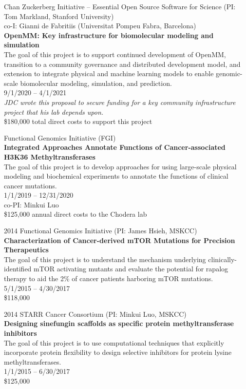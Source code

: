 \documentclass[10pt]{article}
\begin{document}
Chan Zuckerberg Initiative -- Essential Open Source Software for Science (PI: Tom Markland, Stanford University)\\
co-I: Gianni de Fabritiis (Universitat Pompeu Fabra, Barcelona)\\
{\bf OpenMM: Key infrastructure for biomolecular modeling and simulation}\\
The goal of this project is to support continued development of OpenMM, transition to a community governance and distributed development model, and extension to integrate physical and machine learning models to enable genomic-scale biomolecular modeling, simulation, and prediction.\\
9/1/2020 -- 4/1/2021\\
\emph{JDC wrote this proposal to secure funding for a key community infrastructure project that his lab depends upon.}\\
\$180,000 total direct costs to support this project

Functional Genomics Initiative (FGI)  \\
{\bf Integrated Approaches Annotate Functions of Cancer-associated H3K36 Methyltransferases} \\
The goal of this project is to develop approaches for using large-scale physical modeling and biochemical experiments to annotate the functions of clinical cancer mutations.\\
1/1/2019 -- 12/31/2020 \\
co-PI: Minkui Luo \\
\$125,000 annual direct costs to the Chodera lab

\vspace{1.5ex}

2014 Functional Genomics Initiative (PI: James Hsieh, MSKCC) \\
{\bf Characterization of Cancer-derived mTOR Mutations for Precision Therapeutics} \\
The goal of this project is to understand the mechanism underlying clinically-identified mTOR activating mutants and evaluate the potential for rapalog therapy to aid the 2\% of cancer patients harboring mTOR mutations. \\
5/1/2015 -- 4/30/2017 \\
\$118,000
\color{black}

\vspace{1.5ex}

2014 STARR Cancer Consortium (PI: Minkui Luo, MSKCC) \\
{\bf Designing sinefungin scaffolds as specific protein methyltransferase inhibitors} \\
The goal of this project is to use computational techniques that explicitly incorporate protein flexibility to design selective inhibitors for protein lysine methyltransferases. \\
1/1/2015 -- 6/30/2017 \\
\$125,000
\color{black}
\end{document}
